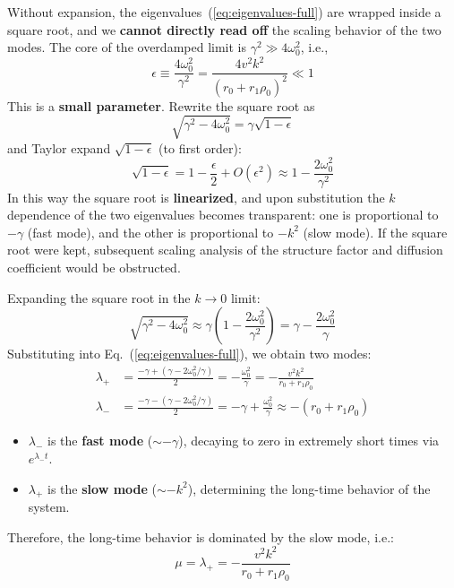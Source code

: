 \begin{derivation}
\begin{remark}
Without expansion, the eigenvalues~(\ref{eq:eigenvalues-full}) are wrapped inside a square root, and we \textbf{cannot directly read off} the scaling behavior of the two modes. The core of the overdamped limit is $\gamma^2 \gg 4\omega_0^2$, i.e.,
\[
\epsilon \equiv \frac{4\omega_0^2}{\gamma^2} = \frac{4v^2 k^2}{(r_0 + r_1\rho_0)^2} \ll 1
\]
This is a \textbf{small parameter}. Rewrite the square root as
\[
\sqrt{\gamma^2 - 4\omega_0^2} = \gamma\sqrt{1 - \epsilon}
\]
and Taylor expand $\sqrt{1 - \epsilon}$ (to first order):
\[
\sqrt{1 - \epsilon} = 1 - \frac{\epsilon}{2} + O(\epsilon^2) \approx 1 - \frac{2\omega_0^2}{\gamma^2}
\]
In this way the square root is \textbf{linearized}, and upon substitution the $k$ dependence of the two eigenvalues becomes transparent: one is proportional to $-\gamma$ (fast mode), and the other is proportional to $-k^2$ (slow mode). If the square root were kept, subsequent scaling analysis of the structure factor and diffusion coefficient would be obstructed.
\end{remark}

Expanding the square root in the $k \to 0$ limit:
\[
\sqrt{\gamma^2 - 4\omega_0^2} \approx \gamma\left(1 - \frac{2\omega_0^2}{\gamma^2}\right) = \gamma - \frac{2\omega_0^2}{\gamma}
\]
Substituting into Eq.~(\ref{eq:eigenvalues-full}), we obtain two modes:
\begin{align}
    \lambda_+ &= \frac{-\gamma + (\gamma - 2\omega_0^2/\gamma)}{2} = -\frac{\omega_0^2}{\gamma} = -\frac{v^2 k^2}{r_0 + r_1\rho_0} \label{eq:slow-mode}\\
    \lambda_- &= \frac{-\gamma - (\gamma - 2\omega_0^2/\gamma)}{2} = -\gamma + \frac{\omega_0^2}{\gamma} \approx -(r_0 + r_1\rho_0) \label{eq:fast-mode}
\end{align}

\begin{itemize}
    \item $\lambda_-$ is the \textbf{fast mode} ($\sim -\gamma$), decaying to zero in extremely short times via $e^{\lambda_- t}$.
    \item $\lambda_+$ is the \textbf{slow mode} ($\sim -k^2$), determining the long-time behavior of the system.
\end{itemize}

Therefore, the long-time behavior is dominated by the slow mode, i.e.:
\begin{equation}\label{eq:eigenvalue}
\boxed{\mu = \lambda_+ = -\frac{v^2 k^2}{r_0 + r_1\rho_0}}
\end{equation}
\end{derivation}

